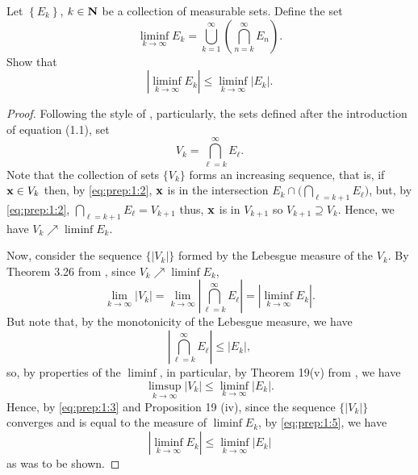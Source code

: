 \begin{problem}
Let $\left\{ E_k \right\}$, $k\in\mathbf{N}$ be a collection of measurable
sets. Define the set
\[
\liminf_{k\to\infty} E_k
=\bigcup_{k=1}^\infty\left(\bigcap_{n=k}^\infty E_n\right).
\]
Show that
\[
\left|\liminf_{k\to\infty} E_k\right|\leq\liminf_{k\to\infty}\left|E_k\right|.
\]
\end{problem}
\begin{proof}
Following the style of \cite[Ch.\@ 1, p.\@ 2]{wheeden-zygmund},
particularly, the sets defined after the introduction of equation (1.1),
set
\begin{equation}
\label{eq:prep:1:2}
V_k=\bigcap_{\ell=k}^\infty E_\ell.
\end{equation}
Note that the collection of sets $\{V_k\}$ forms an increasing
sequence, that is, if $\mathbf{x}\in V_k$ then, by \eqref{eq:prep:1:2}, $\mathbf{x}$ is
in the intersection $E_k\cap\bigl(\bigcap_{\ell=k+1}E_\ell\bigr)$, but, by
\eqref{eq:prep:1:2}, $\bigcap_{\ell=k+1}E_\ell=V_{k+1}$ thus, $\mathbf{x}$
is in $V_{k+1}$ so $V_{k+1}\supseteq V_k$. Hence, we have $V_k\nearrow\liminf
E_k$.

Now, consider the sequence $\{|V_k|\}$ formed by the Lebesgue measure of
the $V_k$. By Theorem 3.26 from \cite[Ch.\@ 3, p.\@
51]{wheeden-zygmund}, since $V_k\nearrow\liminf E_k$,
\begin{equation}
  \label{eq:prep:1:3}
\lim_{k\to\infty}|V_k|=
\lim_{k\to\infty}\left|\bigcap_{\ell=k}^\infty E_\ell\right|=
\left|\liminf_{k\to\infty} E_k\right|.
\end{equation}
But note that, by the monotonicity of the Lebesgue measure, we have
\begin{equation}
  \label{eq:prep:1:4}
\left|\bigcap_{\ell=k}^\infty E_\ell\right|\leq |E_k|,
\end{equation}
so, by properties of the $\liminf$, in particular, by Theorem 19(v) from
\cite[Ch.\@ 1, p.\@ 23]{royden}, we have
\begin{equation}
\label{eq:prep:1:5}
\limsup_{k\to\infty}|V_k|\leq\liminf_{k\to\infty}|E_k|.
\end{equation}
Hence, by \eqref{eq:prep:1:3} and Proposition 19 (iv), since the sequence
$\{|V_k|\}$ converges and is equal to the measure of $\liminf E_k$, by
\eqref{eq:prep:1:5}, we have
\begin{equation}
\label{eq:prep:1:6}
\left|\liminf_{k\to\infty} E_k\right|\leq\liminf_{k\to\infty}|E_k|
\end{equation}
as was to be shown.
\end{proof}

